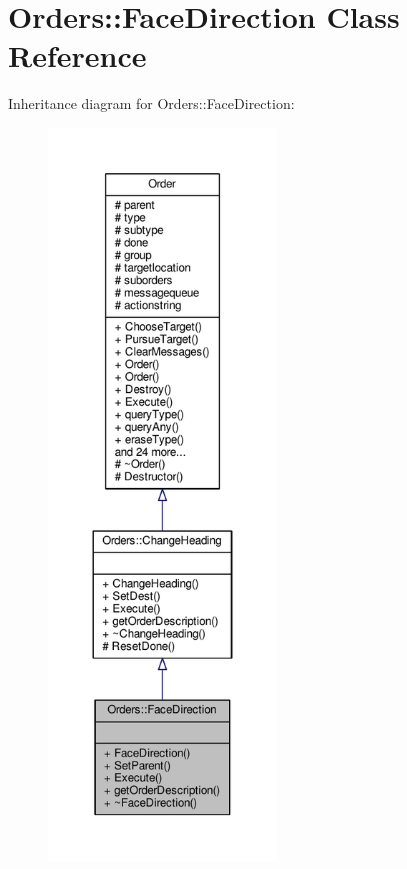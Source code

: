 \hypertarget{classOrders_1_1FaceDirection}{}\section{Orders\+:\+:Face\+Direction Class Reference}
\label{classOrders_1_1FaceDirection}


Inheritance diagram for Orders\+:\+:Face\+Direction\+:
\nopagebreak
\begin{figure}[H]
\begin{center}
\leavevmode
\includegraphics[height=550pt]{d1/dcd/classOrders_1_1FaceDirection__inherit__graph}
\end{center}
\end{figure}


